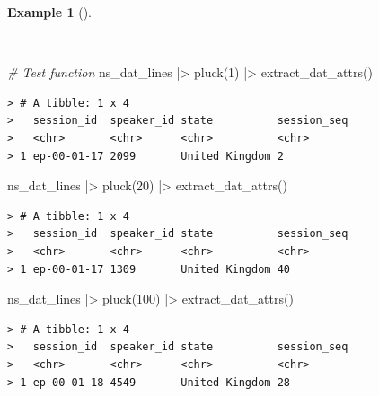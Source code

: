 \documentclass[
  letterpaper,
  DIV=11,
  numbers=noendperiod]{scrreprt}
\newenvironment{Shaded}{\begin{snugshade}}{\end{snugshade}}
\newcommand{\CommentTok}[1]{\textcolor[rgb]{0.00,0.00,0.00}{\textit{#1}}}
\newcommand{\DecValTok}[1]{\textcolor[rgb]{0.00,0.00,0.00}{#1}}
\newcommand{\FunctionTok}[1]{\textcolor[rgb]{0.00,0.00,0.00}{#1}}
\newcommand{\NormalTok}[1]{\textcolor[rgb]{0.00,0.00,0.00}{#1}}
\newcommand{\SpecialCharTok}[1]{\textcolor[rgb]{0.00,0.00,0.00}{#1}}
\theoremstyle{definition}
\newtheorem{example}{Example}[chapter]
\theoremstyle{remark}
\begin{document}
\begin{example}[]\protect\hypertarget{exm-cd-enntt-test-extract-attributes-function}{}\label{exm-cd-enntt-test-extract-attributes-function}

~

\begin{Shaded}
\begin{Highlighting}[]
\CommentTok{\# Test function}
\NormalTok{ns\_dat\_lines }\SpecialCharTok{|\textgreater{}} \FunctionTok{pluck}\NormalTok{(}\DecValTok{1}\NormalTok{) }\SpecialCharTok{|\textgreater{}} \FunctionTok{extract\_dat\_attrs}\NormalTok{()}
\end{Highlighting}
\end{Shaded}

\begin{verbatim}
> # A tibble: 1 x 4
>   session_id  speaker_id state          session_seq
>   <chr>       <chr>      <chr>          <chr>      
> 1 ep-00-01-17 2099       United Kingdom 2
\end{verbatim}

\begin{Shaded}
\begin{Highlighting}[]
\NormalTok{ns\_dat\_lines }\SpecialCharTok{|\textgreater{}} \FunctionTok{pluck}\NormalTok{(}\DecValTok{20}\NormalTok{) }\SpecialCharTok{|\textgreater{}} \FunctionTok{extract\_dat\_attrs}\NormalTok{()}
\end{Highlighting}
\end{Shaded}

\begin{verbatim}
> # A tibble: 1 x 4
>   session_id  speaker_id state          session_seq
>   <chr>       <chr>      <chr>          <chr>      
> 1 ep-00-01-17 1309       United Kingdom 40
\end{verbatim}

\begin{Shaded}
\begin{Highlighting}[]
\NormalTok{ns\_dat\_lines }\SpecialCharTok{|\textgreater{}} \FunctionTok{pluck}\NormalTok{(}\DecValTok{100}\NormalTok{) }\SpecialCharTok{|\textgreater{}} \FunctionTok{extract\_dat\_attrs}\NormalTok{()}
\end{Highlighting}
\end{Shaded}

\begin{verbatim}
> # A tibble: 1 x 4
>   session_id  speaker_id state          session_seq
>   <chr>       <chr>      <chr>          <chr>      
> 1 ep-00-01-18 4549       United Kingdom 28
\end{verbatim}

\end{example}
\end{document}
